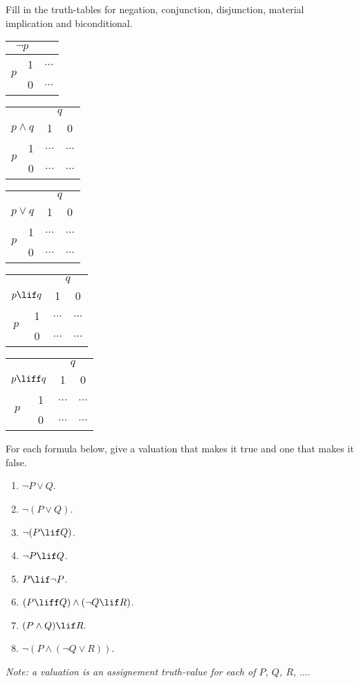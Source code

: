 \documentclass[../../../include/open-logic-section]{subfiles}
\begin{document}


\begin{prob}
Fill in the truth-tables for negation, conjunction, disjunction, material
implication and biconditional.

\noindent
\begin{tabular}{|cc|c|}
\hline 
\multicolumn{2}{|c|}{$\lnot p$} & \tabularnewline
\hline 
\multirow{2}{*}{$p$} & 1 & $\ldots$\tabularnewline
 & 0 & $\ldots$\tabularnewline
\hline 
\end{tabular}\qquad{}%
\begin{tabular}{|cc|cc|}
\hline 
\multicolumn{2}{|c|}{} & \multicolumn{2}{c|}{$q$}\tabularnewline
\multicolumn{2}{|c|}{$p\land q$} & 1 & 0\tabularnewline
\hline 
\multirow{2}{*}{$p$} & 1 & $\ldots$ & $\ldots$\tabularnewline
 & 0 & $\ldots$ & $\ldots$\tabularnewline
\hline 
\end{tabular}\qquad{}%
\begin{tabular}{|cc|cc|}
\hline 
\multicolumn{2}{|c|}{} & \multicolumn{2}{c|}{$q$}\tabularnewline
\multicolumn{2}{|c|}{$p\lor q$} & 1 & 0\tabularnewline
\hline 
\multirow{2}{*}{$p$} & 1 & $\ldots$ & $\ldots$\tabularnewline
 & 0 & $\ldots$ & $\ldots$\tabularnewline
\hline 
\end{tabular}
\begin{tabular}{|cc|cc|}
\hline 
\multicolumn{2}{|c|}{} & \multicolumn{2}{c|}{$q$}\tabularnewline
\multicolumn{2}{|c|}{$p\lif q$} & 1 & 0\tabularnewline
\hline 
\multirow{2}{*}{$p$} & 1 & $\ldots$ & $\ldots$\tabularnewline
 & 0 & $\ldots$ & $\ldots$\tabularnewline
\hline 
\end{tabular}\qquad{}%
\begin{tabular}{|cc|cc|}
\hline 
\multicolumn{2}{|c|}{} & \multicolumn{2}{c|}{$q$}\tabularnewline
\multicolumn{2}{|c|}{$p\liff q$} & 1 & 0\tabularnewline
\hline 
\multirow{2}{*}{$p$} & 1 & $\ldots$ & $\ldots$\tabularnewline
 & 0 & $\ldots$ & $\ldots$\tabularnewline
\hline 
\end{tabular}
\end{prob}

\begin{prob}
For each formula below, give a valuation that makes it true and one
that makes it false.
\begin{enumerate}
\item  $\lnot P\lor Q$.
\item $\lnot(P\lor Q)$.
\item $\lnot(P\lif Q)$.
\item $\lnot P\lif Q$.
\item $P\lif\lnot P$.
\item $(P\liff Q)\land(\lnot Q\lif R)$.
\item $(P\land Q)\lif R.$
\item $\lnot(P\land(\lnot Q\lor R))$.
\end{enumerate}
\emph{Note: a valuation is an assignement truth-value for each of
$P$, $Q$, $R$, $\ldots$}.
\end{prob}
\end{document}
